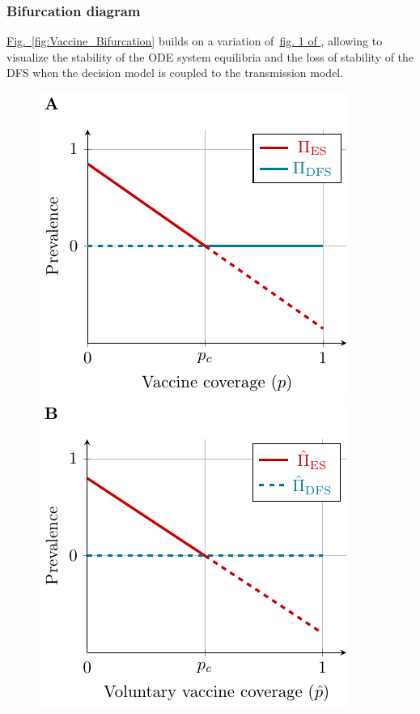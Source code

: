 \newpage
\subsubsection{Bifurcation diagram}
\hyperlink{fig:Vaccine_Bifurcation}{Fig.~\ref*{fig:Vaccine_Bifurcation}} builds on a variation of~\hyperlink{fig:Vaccine_1}{fig. 1 of }, allowing to visualize the stability of the ODE system equilibria and the loss of stability of the DFS when the decision model is coupled to the transmission model.

\begin{figure}[H]
	\centering	
	\includegraphics{Figures/Vaccine/TikZ_Bifurcation/TranscriticalBifurcation}
	\hspace{1cm}
	\includegraphics{Figures/Vaccine/TikZ_Bifurcation/TranscriticalBifurcation_WithGame}

\end{figure}
